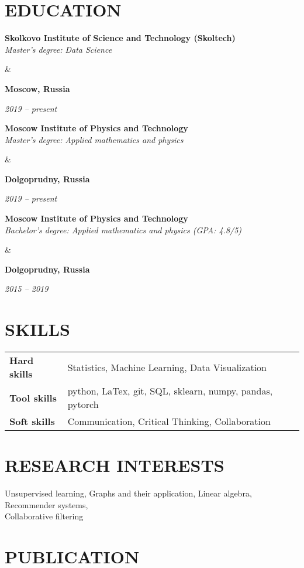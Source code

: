 \documentclass[11pt,a4paper,roman]{moderncv}
\newcommand*{\cvarticle}[7]{
    \parbox[t]{0.90\textwidth}{
    \textcolor{graycv}{\bfseries #2} ({\ithsape #3})\\
	{\itshape #4} \\
	{\footnotesize #5} \href{#6}{(#7)}\vspace{\parsep}
    }&\parbox[t]{0.10\textwidth}{
    \hfill {\itshape #1}}
}
\newcommand*{\cvpublic}[4]{
    \parbox[t]{0.78\textwidth}{
    {\bfseries #3} \\ {\itshape #4}
    }&\parbox[t]{0.22\textwidth}{
    {\hfill {\bfseries #2}}\\
    {\strut\hfill {\itshape #1}}}
}
\begin{document}
\section{EDUCATION}

{\cvpublic{2019 -- present}
          {Moscow, Russia}
          {Skolkovo Institute of Science and Technology (Skoltech)}
          {Master's degree: Data Science}}

{\cvpublic{2019 -- present}
          {Dolgoprudny, Russia}
          {Moscow Institute of Physics and Technology}
          {Master's degree: Applied mathematics and physics}}

{\cvpublic{2015 -- 2019}
          {Dolgoprudny, Russia}
          {Moscow Institute of Physics and Technology}
          {Bachelor's degree: Applied mathematics and physics (GPA: 4.8/5)}}
\section{SKILLS}
\begin{tabular}{@{}l l} 
    {\bfseries Hard skills} & Statistics, Machine Learning, Data Visualization\\
    {\bfseries Tool skills} & python, LaTex, git, SQL, sklearn, numpy, pandas, pytorch \\
    {\bfseries Soft skills} & Communication, Critical Thinking, Collaboration\\
  \end{tabular}

\section{RESEARCH INTERESTS}
Unsupervised learning, Graphs and their application, Linear algebra, Recommender systems,\\ Collaborative filtering

\section{PUBLICATION}

\end{document}
